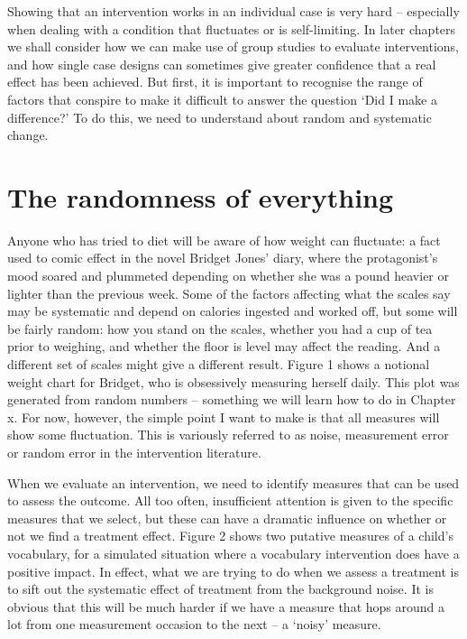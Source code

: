 \documentclass[]{book}
\begin{document}
Showing that an intervention works in an individual case is very hard -- especially when dealing with a condition that fluctuates or is self-limiting. In later chapters we shall consider how we can make use of group studies to evaluate interventions, and how single case designs can sometimes give greater confidence that a real effect has been achieved. But first, it is important to recognise the range of factors that conspire to make it difficult to answer the question `Did I make a difference?' To do this, we need to understand about random and systematic change.

\hypertarget{the-randomness-of-everything}{%
\section{The randomness of everything}\label{the-randomness-of-everything}}

Anyone who has tried to diet will be aware of how weight can fluctuate: a fact used to comic effect in the novel Bridget Jones' diary, where the protagonist's mood soared and plummeted depending on whether she was a pound heavier or lighter than the previous week. Some of the factors affecting what the scales say may be systematic and depend on calories ingested and worked off, but some will be fairly random: how you stand on the scales, whether you had a cup of tea prior to weighing, and whether the floor is level may affect the reading. And a different set of scales might give a different result. Figure 1 shows a notional weight chart for Bridget, who is obsessively measuring herself daily. This plot was generated from random numbers -- something we will learn how to do in Chapter x. For now, however, the simple point I want to make is that all measures will show some fluctuation. This is variously referred to as noise, measurement error or random error in the intervention literature.

When we evaluate an intervention, we need to identify measures that can be used to assess the outcome. All too often, insufficient attention is given to the specific measures that we select, but these can have a dramatic influence on whether or not we find a treatment effect. Figure 2 shows two putative measures of a child's vocabulary, for a simulated situation where a vocabulary intervention does have a positive impact. In effect, what we are trying to do when we assess a treatment is to sift out the systematic effect of treatment from the background noise. It is obvious that this will be much harder if we have a measure that hops around a lot from one measurement occasion to the next -- a `noisy' measure.
\end{document}

